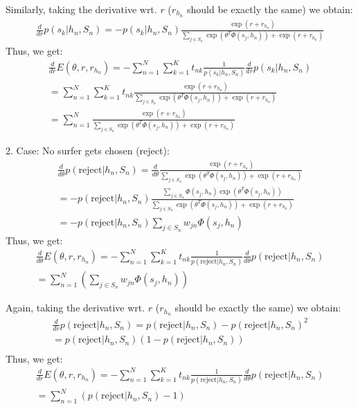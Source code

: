 Similarly, taking the derivative wrt. $r$ ($r_{h_n}$ should be exactly the same) we obtain:
\begin{eqnarray}
\frac{d}{d r} p(s_k | h_n, S_n) = -  p(s_k | h_n, S_n)  \frac{\exp(r + r_{h_n})}{\sum_{j \in S_n} \exp(\theta^T \Phi(s_j,h_n)) + \exp(r + r_{h_n})}
\end{eqnarray}
Thus, we get:
\begin{eqnarray}
\frac{d}{d r} E(\theta, r, r_{h_n}) = - \sum_{n=1}^N \sum_{k=1}^K t_{nk} \frac{1}{p(s_k | h_n, S_n)} \frac{d}{d r} p(s_k | h_n, S_n)\\
= \sum_{n=1}^N \sum_{k=1}^K t_{nk} \frac{\exp(r + r_{h_n})}{\sum_{j \in S_n} \exp(\theta^T \Phi(s_j,h_n)) + \exp(r + r_{h_n})} \\
= \sum_{n=1}^N \frac{\exp(r + r_{h_n})}{\sum_{j \in S_n} \exp(\theta^T \Phi(s_j,h_n)) + \exp(r + r_{h_n})}
\end{eqnarray}



2. Case: No surfer gets chosen (reject):
\begin{eqnarray}
\frac{d}{d \theta} p(\text{reject} | h_n, S_n) = \frac{d}{d \theta} \frac{\exp(r+r_{h_n})}{\sum_{j \in S_n} \exp(\theta^T \Phi(s_j,h_n)) + \exp(r + r_{h_n})}\\
= - p(\text{reject} | h_n, S_n) \frac{\sum_{j \in S_n} \Phi(s_j,h_n) \exp(\theta^T \Phi(s_j,h_n))}{\sum_{j \in S_n} \exp(\theta^T \Phi(s_j,h_n)) + \exp(r + r_{h_n})} \\
= - p(\text{reject} | h_n, S_n) \sum_{j \in S_n} w_{jn} \Phi(s_j,h_n)
\end{eqnarray}
Thus, we get:
\begin{eqnarray}
\frac{d}{d \theta} E(\theta, r, r_{h_n}) = - \sum_{n=1}^N \sum_{k=1}^K t_{nk} \frac{1}{p(\text{reject} | h_n, S_n)} \frac{d}{d \theta} p(\text{reject} | h_n, S_n)\\
= \sum_{n=1}^N (\sum_{j \in S_n} w_{jn} \Phi(s_j,h_n))
\end{eqnarray}



Again, taking the derivative wrt. $r$ ($r_{h_n}$ should be exactly the same) we obtain:
\begin{eqnarray}
\frac{d}{d r} p(\text{reject} | h_n, S_n) = p(\text{reject} | h_n, S_n) - p(\text{reject} | h_n, S_n)^2\\
= p(\text{reject} | h_n, S_n) (1 - p(\text{reject} | h_n, S_n))\\
\end{eqnarray}
Thus, we get:
\begin{eqnarray}
\frac{d}{d r} E(\theta, r, r_{h_n}) = - \sum_{n=1}^N \sum_{k=1}^K t_{nk} \frac{1}{p(\text{reject} | h_n, S_n)} \frac{d}{d \theta} p(\text{reject} | h_n, S_n)\\
= \sum_{n=1}^N (p(\text{reject} | h_n, S_n)-1)
\end{eqnarray}


